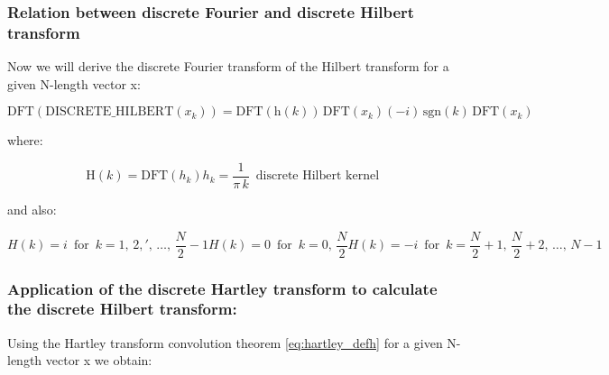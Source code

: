 \documentclass[12pt,twoside,a4paper]{article}
\numberwithin{equation}{subsection}
\numberwithin{figure}{subsection}
\begin{document}
\subsubsection*{Relation between discrete Fourier and discrete Hilbert transform}

Now we will derive the discrete Fourier transform of the Hilbert transform for a given N-length vector x:

\begin{equation} \label{eq:hartley_dfttheorem}
  \mathrm{DFT}(\mathrm{DISCRETE\_HILBERT}({x_{k}}))=\mathrm{DFT}(\mathrm{h}(k))\,\mathrm{DFT}({x_{k}}) (-
  i)\,\mathrm{sgn}(k)\,\mathrm{DFT}({x_{k}})
\end{equation}

where: 

\begin{subequations} \label{eq:hartley_dfttparams}
  \begin{equation}   \label{eq:hdfttps_bigh}
    \mathrm{H}(k) = \mathrm{DFT}({h_{k}})
  \end{equation}
  \begin{equation}   \label{eq:hdfttps_smallh}
    {h_{k}}=\frac {1}{\pi \,k}\,\mbox{ discrete Hilbert kernel }  
  \end{equation}
\end{subequations} 

and also: 

\begin{subequations} \label{eq:hartley_defh}
  \begin{equation}   \label{eq:hdefh_fhalf}
    H(k) = i \,\mbox{ for }\, k=1, \,2,',\,\ldots,\,\frac {N}{2} - 1
  \end{equation}
  \begin{equation}   \label{eq:hdefh_middle}
    H(k) = 0\,\mbox{ for }\,  k=0, \,\frac {N}{2}
  \end{equation}
  \begin{equation}   \label{eq:hdefh_shalf}
    H(k) = -i\, \mbox{ for } \,k=\frac {N}{2} + 1, \,\frac {N}{2} + 2,\,\ldots,\,N - 1
  \end{equation}
\end{subequations}

\subsubsection*{Application of the discrete Hartley transform to calculate the discrete Hilbert transform:}

Using the Hartley transform convolution theorem \ref{eq:hartley_defh} for a given N-length vector x we obtain:
\end{document}
